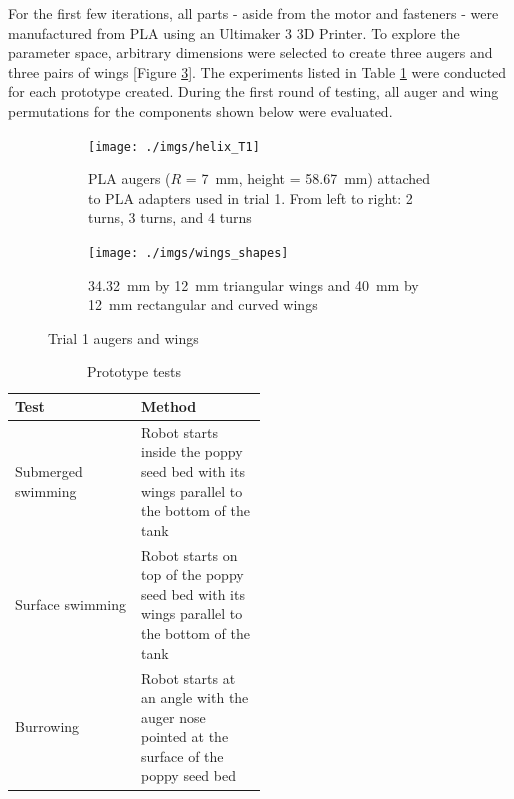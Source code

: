 \documentclass[letterpaper, 11 pt]{article}
\begin{document}
For the first few iterations, all parts - aside from the motor and fasteners - were manufactured from PLA using an Ultimaker 3 3D Printer. To explore the parameter space, arbitrary dimensions were selected to create three augers and three pairs of wings [Figure \ref{fig:trial1}]. The experiments listed in Table \ref{tests} were conducted for each prototype created. During the first round of testing, all auger and wing permutations for the components shown below were evaluated.   
\begin{figure}[H]
\captionsetup[subfigure]{width=0.9\textwidth}
\centering
\begin{subfigure}{.5\textwidth}
	\centering
	\texttt{[image: ./imgs/helix\_T1]}
	\caption{PLA augers ($R$ = \SI{7}{\milli\m}, height = \SI{58.67}{\milli\m}) attached to PLA adapters used in trial 1. From left to right: 2 turns, 3 turns, and 4 turns}
	\label{fig:helix_T1}
\end{subfigure}%
\begin{subfigure}{.5\textwidth}
	\centering
	\texttt{[image: ./imgs/wings\_shapes]}
	\caption{\SI{34.32}{\milli\m} by \SI{12}{\milli\m} triangular wings and \SI{40}{\milli\m} by \SI{12}{\milli\m} rectangular and curved wings}
	\label{fig:wings_shapes}
\end{subfigure}
\caption{Trial 1 augers and wings}
\label{fig:trial1}
\end{figure} 

\begin{table}[H] 
\centering
\caption{Prototype tests}
	\begin{tabular}{l|p{0.5\linewidth}}
	\textbf{Test} & \textbf{Method} \\
	\hline
	Submerged swimming & Robot starts inside the poppy seed bed with its wings parallel to the bottom of the tank\\
	Surface swimming & Robot starts on top of the poppy seed bed with its wings parallel to the bottom of the tank\\
	Burrowing & Robot starts at an angle with the auger nose pointed at the surface of the poppy seed bed\\
	\end{tabular}
	\label{tests}
\end{table}
\end{document}
